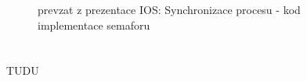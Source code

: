 \documentclass[a4paper, 11pt]{article}
\begin{document}
\begin{figure} [h]
    \centering
    \caption{prevzat z prezentace IOS: Synchronizace procesu - kod implementace semaforu}
\end{figure}

\newpage
\section{}
TUDU
\end{document}

